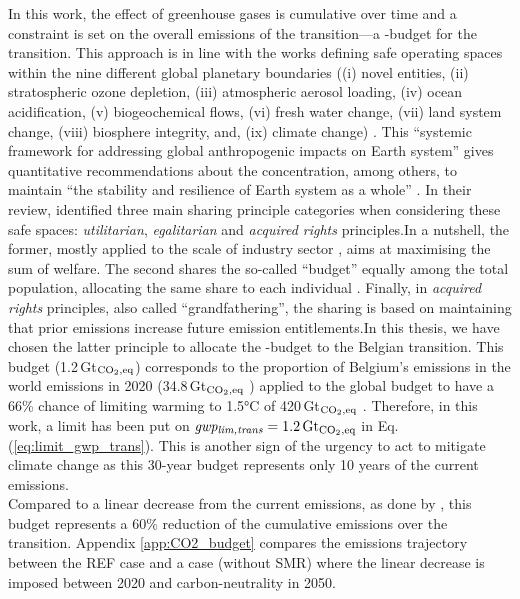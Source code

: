 In this work, the effect of greenhouse gases is cumulative over time and a constraint is set on the overall emissions of the transition---a -budget for the transition. This approach is in line with the works defining safe operating spaces within the nine different global planetary boundaries (\ie (i) novel entities, (ii) stratospheric ozone depletion, (iii) atmospheric aerosol loading, (iv) ocean acidification, (v) biogeochemical flows, (vi) fresh water change, (vii) land system change, (viii) biosphere integrity, and, (ix) climate change) \cite{richardson2023earth,steffen2015planetary,rockstrom2009safe}. This ``systemic framework for addressing global anthropogenic impacts on Earth system'' gives quantitative recommendations about the  concentration, among others, to maintain ``the stability and resilience of Earth system as a whole'' \cite{richardson2023earth}. In their review, \citet{ryberg2020downscaling} identified three main sharing principle categories when considering these safe spaces: \ie \textit{utilitarian}, \textit{egalitarian} and \textit{acquired rights} principles.In a nutshell, the former, mostly applied to the scale of industry sector \cite{ryberg2018bring,brejnrod2017absolute}, aims at maximising the sum of welfare. The second shares the so-called ``budget'' equally among the total population, allocating the same share to each individual \cite{hoff2017bringing,o2018good}. Finally, in \textit{acquired rights} principles, also called ``grandfathering'', the sharing is based on \og maintaining that prior emissions increase future emission entitlements\fg  \cite{knight2013grandfathering}.In this thesis, we have chosen the latter principle to allocate the -budget to the Belgian transition. This budget (1.2\,Gt$_{\ce{CO2},\text{eq}}$) corresponds to the proportion of Belgium's emissions in the world emissions in 2020 (34.8\,Gt$_{\ce{CO2},\text{eq}}$ \cite{ourworldindata_CO2_world}) applied to the global budget to have a 66\% chance of limiting warming to 1.5°C of 420\,Gt$_{\ce{CO2},\text{eq}}$ \cite{IPCC_CO2_budget}. Therefore, in this work, a limit has been put on $\emph{gwp\textsubscript{lim,trans}}=1.2\,\text{Gt}_{\ce{CO2},\text{eq}}$ in Eq.\,(\ref{eq:limit_gwp_trans}). This is another sign of the urgency to act to mitigate climate change as this 30-year budget represents only 10 years of the current emissions. \\

Compared to a linear decrease from the current emissions, as done by \citet{limpens2024pathway}, this budget represents a 60\% reduction of the cumulative emissions over the transition.  Appendix \ref{app:CO2_budget} compares the emissions trajectory between the REF case and a case (without \gls{SMR}) where the linear decrease is imposed between 2020 and carbon-neutrality in 2050.